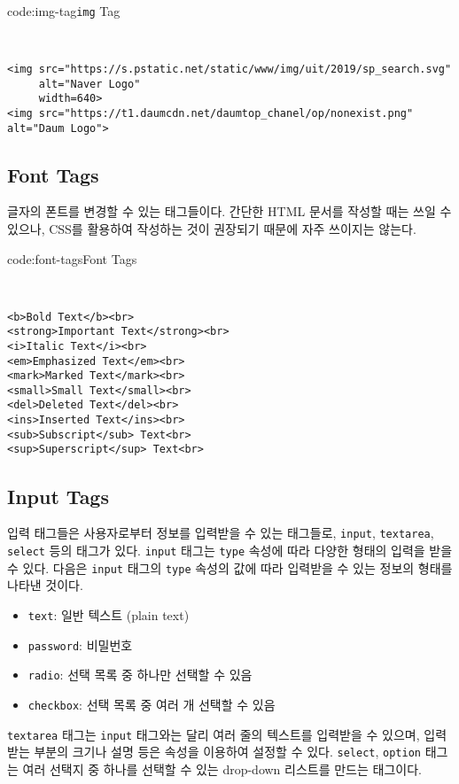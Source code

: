 \begin{codeenv}{code:img-tag}{\texttt{img} Tag}\begin{verbatim}


<img src="https://s.pstatic.net/static/www/img/uit/2019/sp_search.svg"
     alt="Naver Logo"
     width=640>
<img src="https://t1.daumcdn.net/daumtop_chanel/op/nonexist.png" alt="Daum Logo">
\end{verbatim}
\end{codeenv}

\subsection*{Font Tags}
글자의 폰트를 변경할 수 있는 태그들이다. 간단한 HTML 문서를 작성할 때는 쓰일 수 있으나, CSS를 활용하여 작성하는 것이 권장되기 때문에 자주 쓰이지는 않는다. 

\begin{codeenv}{code:font-tags}{Font Tags}\begin{verbatim}


<b>Bold Text</b><br>
<strong>Important Text</strong><br>
<i>Italic Text</i><br>
<em>Emphasized Text</em><br>
<mark>Marked Text</mark><br>
<small>Small Text</small><br>
<del>Deleted Text</del><br>
<ins>Inserted Text</ins><br>
<sub>Subscript</sub> Text<br>
<sup>Superscript</sup> Text<br>
\end{verbatim}
\end{codeenv}

\subsection*{Input Tags}
입력 태그들은 사용자로부터 정보를 입력받을 수 있는 태그들로, \verb|input|, \verb|textarea|, \verb|select| 등의 태그가 있다. \verb|input| 태그는 \verb|type| 속성에 따라 다양한 형태의 입력을 받을 수 있다. 다음은 \verb|input| 태그의 \verb|type| 속성의 값에 따라 입력받을 수 있는 정보의 형태를 나타낸 것이다.

\begin{itemize}
    \item \verb|text|: 일반 텍스트 (plain text)
    \item \verb|password|: 비밀번호
    \item \verb|radio|: 선택 목록 중 하나만 선택할 수 있음
    \item \verb|checkbox|: 선택 목록 중 여러 개 선택할 수 있음
\end{itemize}

\verb|textarea| 태그는 \verb|input| 태그와는 달리 여러 줄의 텍스트를 입력받을 수 있으며, 입력받는 부분의 크기나 설명 등은 속성을 이용하여 설정할 수 있다. \verb|select|, \verb|option| 태그는 여러 선택지 중 하나를 선택할 수 있는 drop-down 리스트를 만드는 태그이다. 

